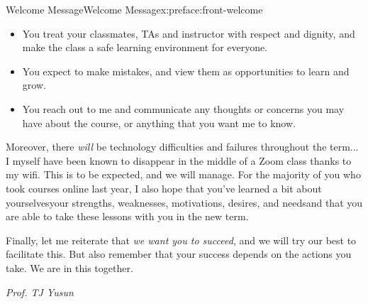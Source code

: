 \documentclass[oneside,10pt,]{book}
\numberwithin{equation}{section}
\begin{document}
\begin{preface}{Welcome Message}{}{Welcome Message}{}{}{x:preface:front-welcome}
\begin{itemize}[label=\textbullet]
\item{}You treat your classmates, TAs and instructor with respect and dignity, and make the class a safe learning environment for everyone.%
\item{}You expect to make mistakes, and view them as opportunities to learn and grow.%
\item{}You reach out to me and communicate any thoughts or concerns you may have about the course, or anything that you want me to know.%
\end{itemize}
%
\par
Moreover, there \emph{will} be technology difficulties and failures throughout the term... I myself have been known to disappear in the middle of a Zoom class thanks to my wifi. This is to be expected, and we will manage. For the majority of you who took courses online last year, I also hope that you've learned a bit about yourselves\textemdash{}your strengths, weaknesses, motivations, desires, and needs\textemdash{}and that you are able to take these lessons with you in the new term.%
\par
Finally, let me reiterate that \emph{we want you to succeed}, and we will try our best to facilitate this. But also remember that your success depends on the actions you take. We are in this together.%
\par
\emph{Prof. TJ Yusun}%
\end{preface}
%
%
\typeout{************************************************}
\typeout{************************************************}
%
\end{document}
